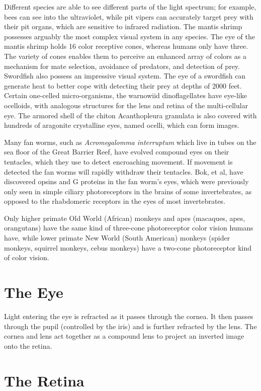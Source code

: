 \documentclass[]{book}
\begin{document}
Different species are able to see different parts of the light spectrum; for example, bees can see into the ultraviolet, while pit vipers can accurately target prey with their pit organs, which are sensitive to infrared radiation. The mantis shrimp possesses arguably the most complex visual system in any species. The eye of the mantis shrimp holds 16 color receptive cones, whereas humans only have three. The variety of cones enables them to perceive an enhanced array of colors as a mechanism for mate selection, avoidance of predators, and detection of prey. Swordfish also possess an impressive visual system. The eye of a swordfish can generate heat to better cope with detecting their prey at depths of 2000 feet. Certain one-celled micro-organisms, the warnowiid dinoflagellates have eye-like ocelloids, with analogous structures for the lens and retina of the multi-cellular eye. The armored shell of the chiton Acanthopleura granulata is also covered with hundreds of aragonite crystalline eyes, named ocelli, which can form images.

Many fan worms, such as \emph{Acromegalomma interruptum} which live in tubes on the sea floor of the Great Barrier Reef, have evolved compound eyes on their tentacles, which they use to detect encroaching movement. If movement is detected the fan worms will rapidly withdraw their tentacles. Bok, et al, have discovered opsins and G proteins in the fan worm's eyes, which were previously only seen in simple ciliary photoreceptors in the brains of some invertebrates, as opposed to the rhabdomeric receptors in the eyes of most invertebrates.

Only higher primate Old World (African) monkeys and apes (macaques, apes, orangutans) have the same kind of three-cone photoreceptor color vision humans have, while lower primate New World (South American) monkeys (spider monkeys, squirrel monkeys, cebus monkeys) have a two-cone photoreceptor kind of color vision.

\hypertarget{the-eye}{%
\section{The Eye}\label{the-eye}}

Light entering the eye is refracted as it passes through the cornea. It then passes through the pupil (controlled by the iris) and is further refracted by the lens. The cornea and lens act together as a compound lens to project an inverted image onto the retina.

\hypertarget{the-retina}{%
\section{The Retina}\label{the-retina}}
\end{document}
